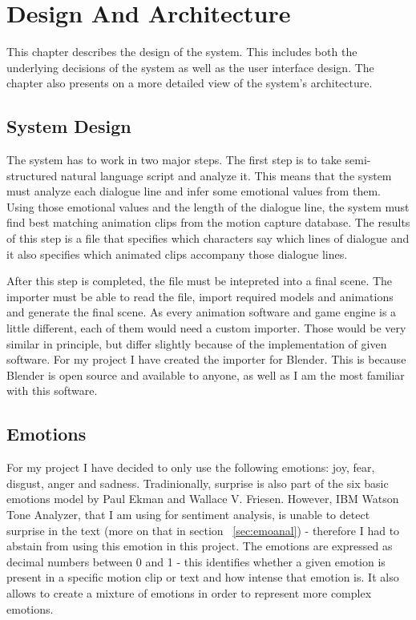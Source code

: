 \chapter{Design And Architecture\label{chap:design}}

This chapter describes the design of the system. This includes both the underlying decisions of the system as well as the user interface design. The chapter also presents on a more detailed view of the system's architecture.

\section{System Design}

The system has to work in two major steps. The first step is to take semi-structured natural language script and analyze it. This means that the system must analyze each dialogue line and infer some emotional values from them. Using those emotional values and the length of the dialogue line, the system must find best matching animation clips from the motion capture database. The results of this step is a file that specifies which characters say which lines of dialogue and it also specifies which animated clips accompany those dialogue lines.

After this step is completed, the file must be intepreted into a final scene. The importer must be able to read the file, import required models and animations and generate the final scene. As every animation software and game engine is a little different, each of them would need a custom importer. Those would be very similar in principle, but differ slightly because of the implementation of given software. For my project I have created the importer for Blender. This is because Blender is open source and available to anyone, as well as I am the most familiar with this software.


\section{Emotions}

For my project I have decided to only use the following emotions: joy, fear, disgust, anger and sadness. Tradinionally, surprise is also part of the six basic emotions model by Paul Ekman and Wallace V. Friesen. However, IBM Watson Tone Analyzer, that I am using for sentiment analysis, is unable to detect surprise in the text (more on that in section ~\ref{sec:emoanal}) - therefore I had to abstain from using this emotion in this project. The emotions are expressed as decimal numbers between 0 and 1 - this identifies whether a given emotion is present in a specific motion clip or text and how intense that emotion is. It also allows to create a mixture of emotions in order to represent more complex emotions.


